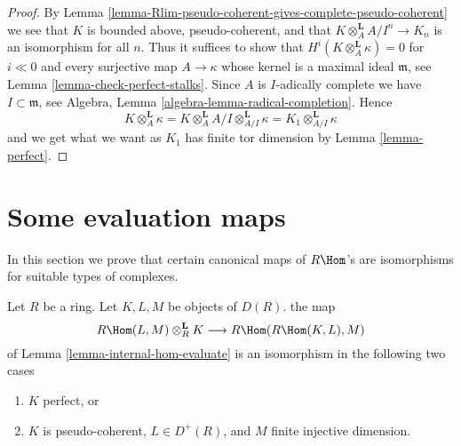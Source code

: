 \begin{proof}
By Lemma \ref{lemma-Rlim-pseudo-coherent-gives-complete-pseudo-coherent}
we see that $K$ is bounded above, pseudo-coherent, and that
$K \otimes_A^\mathbf{L} A/I^n \to K_n$ is an isomorphism for all $n$.
Thus it suffices to show that $H^i(K \otimes_A^\mathbf{L} \kappa) = 0$ for
$i \ll 0$ and every surjective map $A \to \kappa$ whose kernel is
a maximal ideal $\mathfrak m$, see
Lemma \ref{lemma-check-perfect-stalks}.
Since $A$ is $I$-adically complete we have $I \subset \mathfrak m$, see
Algebra, Lemma \ref{algebra-lemma-radical-completion}.
Hence
$$
K \otimes_A^\mathbf{L} \kappa =
K \otimes_A^\mathbf{L} A/I \otimes_{A/I}^\mathbf{L} \kappa =
K_1 \otimes_{A/I}^\mathbf{L} \kappa
$$
and we get what we want as $K_1$ has finite tor dimension by
Lemma \ref{lemma-perfect}.
\end{proof}





\section{Some evaluation maps}
\label{section-evaluation}

\noindent
In this section we prove that certain canonical maps of
$R\Hom$'s are isomorphisms for suitable types of complexes.

\begin{lemma}
\label{lemma-internal-hom-evaluate-isomorphism}
Let $R$ be a ring. Let $K, L, M$ be objects of $D(R)$.
the map
$$
R\Hom(L, M) \otimes_R^\mathbf{L} K \longrightarrow R\Hom(R\Hom(K, L), M)
$$
of Lemma \ref{lemma-internal-hom-evaluate} is an isomorphism
in the following two cases
\begin{enumerate}
\item $K$ perfect, or
\item $K$ is pseudo-coherent, $L \in D^+(R)$, and $M$ finite injective
dimension.
\end{enumerate}
\end{lemma}


